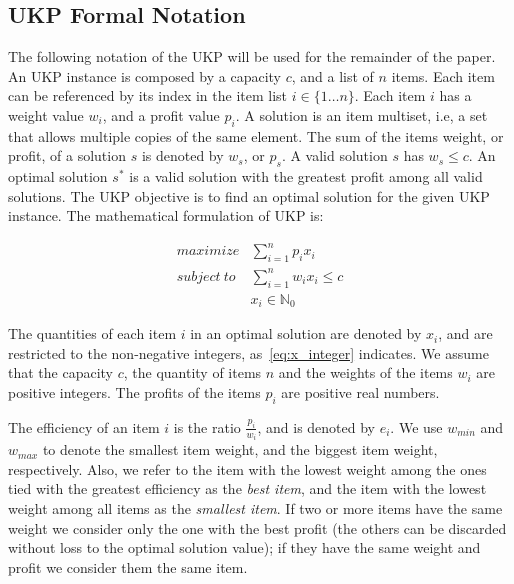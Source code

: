 \documentclass[runningheads,a4paper]{llncs}
\begin{document}

\subsection{UKP Formal Notation}

The following notation of the UKP will be used for the remainder of the paper. An UKP instance is composed by a capacity \(c\), and a list of \(n\) items.
Each item can be referenced by its index in the item list \(i \in \{1\dots n\}\). 
Each item \(i\) has a weight value \(w_i\), and a profit value \(p_i\).
A solution is an item multiset, i.e, a set that allows multiple copies of the same element.
The sum of the items weight, or profit, of a solution \(s\) is denoted by \(w_s\), or \(p_s\).
A valid solution \(s\) has \(w_s \leq c\).
An optimal solution \(s^*\) is a valid solution with the greatest profit among all valid solutions.
The UKP objective is to find an optimal solution for the given UKP instance. 
The mathematical formulation of UKP is:

\begin{align}
  maximize &\sum_{i=1}^n p_i x_i\label{eq:objfun}\\
subject~to &\sum_{i=1}^n w_i x_i \leq c\label{eq:capcons}\\
            &x_i \in \mathbb{N}_0\label{eq:x_integer}
\end{align}

The quantities of each item \(i\) in an optimal solution are denoted by \(x_i\), and are restricted to the non-negative integers, as~\eqref{eq:x_integer} indicates. 
We assume that the capacity \(c\), the quantity of items \(n\) and the weights of the items \(w_i\) are positive integers. 
The profits of the items \(p_i\) are positive real numbers.

The efficiency of an item \(i\) is the ratio \(\frac{p_i}{w_i}\), and is denoted by \(e_i\). 
We use \(w_{min}\) and \(w_{max}\) to denote the smallest item weight, and the biggest item weight, respectively. 
Also, we refer to the item with the lowest weight among the ones tied with the greatest efficiency as the \emph{best item}, 
and the item with the lowest weight among all items as the \emph{smallest item}.
If two or more items have the same weight we consider only the one with the best profit (the others can be discarded without loss to the optimal solution value); if they have the same weight and profit we consider them the same item.
\end{document}
